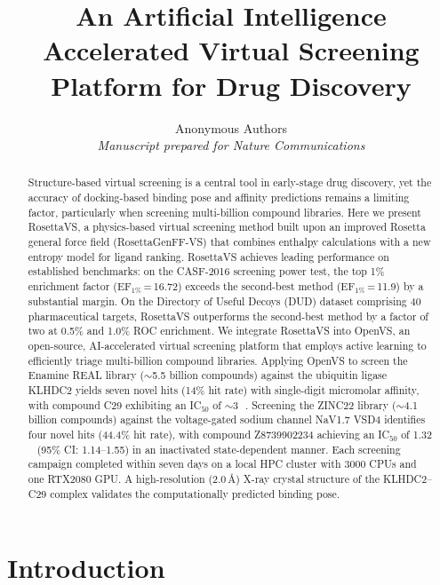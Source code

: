 \documentclass[11pt]{article}
\title{An Artificial Intelligence Accelerated Virtual Screening Platform for Drug Discovery}
\author{%
  Anonymous Authors\\
  \textit{Manuscript prepared for Nature Communications}
}
\date{}
\begin{document}
\maketitle

\begin{abstract}
Structure-based virtual screening is a central tool in early-stage drug discovery, yet the accuracy of docking-based binding pose and affinity predictions remains a limiting factor, particularly when screening multi-billion compound libraries. Here we present RosettaVS, a physics-based virtual screening method built upon an improved Rosetta general force field (RosettaGenFF-VS) that combines enthalpy calculations with a new entropy model for ligand ranking. RosettaVS achieves leading performance on established benchmarks: on the CASF-2016 screening power test, the top 1\% enrichment factor (EF$_{1\%}$\,=\,16.72) exceeds the second-best method (EF$_{1\%}$\,=\,11.9) by a substantial margin. On the Directory of Useful Decoys (DUD) dataset comprising 40 pharmaceutical targets, RosettaVS outperforms the second-best method by a factor of two at 0.5\% and 1.0\% ROC enrichment. We integrate RosettaVS into OpenVS, an open-source, AI-accelerated virtual screening platform that employs active learning to efficiently triage multi-billion compound libraries. Applying OpenVS to screen the Enamine REAL library (${\sim}$5.5 billion compounds) against the ubiquitin ligase KLHDC2 yields seven novel hits (14\% hit rate) with single-digit micromolar affinity, with compound C29 exhibiting an IC$_{50}$ of ${\sim}$3\,\si{\micro\molar}. Screening the ZINC22 library (${\sim}$4.1 billion compounds) against the voltage-gated sodium channel NaV1.7 VSD4 identifies four novel hits (44.4\% hit rate), with compound Z8739902234 achieving an IC$_{50}$ of 1.32\,\si{\micro\molar} (95\% CI: 1.14--1.55) in an inactivated state-dependent manner. Each screening campaign completed within seven days on a local HPC cluster with 3000 CPUs and one RTX2080 GPU. A high-resolution (2.0\,\AA) X-ray crystal structure of the KLHDC2--C29 complex validates the computationally predicted binding pose.
\end{abstract}

\section{Introduction}
\end{document}
